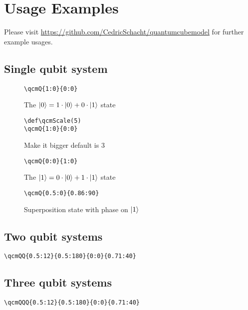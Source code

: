 \documentclass{article}
\begin{document}
\clearpage
\section*{Usage Examples}
Please visit \href{https://github.com/CedricSchacht/quantumcubemodel}{https://github.com/CedricSchacht/quantumcubemodel}
for further example usages.
\subsection*{Single qubit system}
\begin{figure}[!ht]
    \begin{verbatim}
\qcmQ{1:0}{0:0}
    \end{verbatim}
    \centering
    \caption{The $\ket{0} = 1 \cdot \ket{0} + 0 \cdot \ket{1}$ state}
\end{figure}

\begin{figure}[!ht]
    \begin{verbatim}
\def\qcmScale(5)
\qcmQ{1:0}{0:0}
    \end{verbatim}
    \centering
    \def\qcmScale{5}
    \caption{Make it bigger default is 3}
\end{figure}

\begin{figure}[!ht]
    \begin{verbatim}
\qcmQ{0:0}{1:0}
    \end{verbatim}
    \centering
    \caption{The $\ket{1} = 0 \cdot \ket{0} + 1 \cdot \ket{1}$ state}
\end{figure}

\begin{figure}[!ht]
    \begin{verbatim}
\qcmQ{0.5:0}{0.86:90}
    \end{verbatim}
    \centering
    \caption{Superposition state with phase on $\ket{1}$}
\end{figure}

\pagebreak

\noindent\begin{minipage}[t]{0.5\textwidth}
    \subsection*{Two qubit systems}
    \begin{verbatim}
\qcmQQ{0.5:12}{0.5:180}{0:0}{0.71:40}
    \end{verbatim}
    \centering
\end{minipage}%
\begin{minipage}[t]{0.5\textwidth}
    \subsection*{Three qubit systems}
    \begin{verbatim}
\qcmQQQ{0.5:12}{0.5:180}{0:0}{0.71:40}
    \end{verbatim}
    \centering
    \def\qcmScale{2.5}
\end{minipage}
\end{document}
